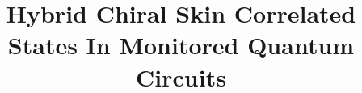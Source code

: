 \documentclass[longbibliography, aps, prx, amsmath, amssymb, amsfonts, twocolumn,superscriptaddress, footinbib]{revtex4-1}
\begin{document}
	
	
	\title{Hybrid Chiral Skin Correlated States In Monitored Quantum Circuits}

	


\end{document}
